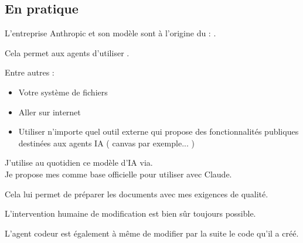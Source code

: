 \subsection{En pratique}
\begin{Aide}

    \begin{MultiColonnes}{5}
        \tcbitem[raster multicolumn=2] L'entreprise Anthropic et son modèle  sont à l'origine du  : .
        
        Cela permet aux agents d'utiliser . 
    
        \tcbitem[raster multicolumn=3] Entre autres : 
    \begin{itemize}[label=$\bullet$]
        \item Votre système de fichiers
        \item Aller sur internet
        \item Utiliser n'importe quel outil externe qui propose des fonctionnalités publiques destinées aux agents IA ( canvas par exemple... )
    \end{itemize}
    \end{MultiColonnes}
    

    \begin{MultiColonnes}{5}
        \tcbitem[raster multicolumn=3] J'utilise au quotidien ce modèle d'IA via. \\
    
    Je propose mes  comme base officielle pour utiliser  avec Claude.

    Cela lui permet de préparer les documents avec mes exigences de qualité.
    \tcbitem[raster multicolumn=2,colframe=\itemBaseColor,title=Prompts de bfcours, boxrule=0.4pt,fonttitle=\bfseries,halign=left] 
    \end{MultiColonnes}
    L'intervention humaine de modification est bien sûr toujours possible. 
    
    L'agent codeur est également à même de modifier par la suite le code qu'il a créé.


\end{Aide}
